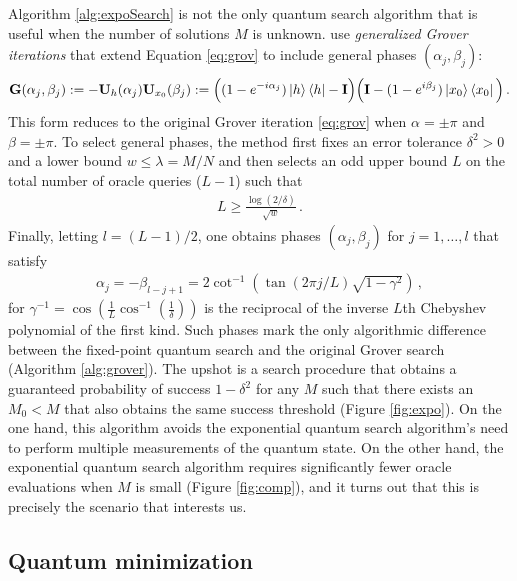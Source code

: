 \documentclass[12pt]{article} %
\begin{document}
 
Algorithm \ref{alg:expoSearch} is not the only quantum search algorithm that is useful when the number of solutions $M$ is unknown.  \citet{yoder2014fixed} use \emph{generalized Grover iterations} that extend Equation \eqref{eq:grov} to include general phases $(\alpha_j,\beta_j)$:
\begin{align}\label{eq:grovGen}
	\mathbf{G}(\alpha_j,\beta_j) := - \mathbf{U}_h(\alpha_j) \mathbf{U}_{x_0}(\beta_j) := \Big((1-e^{-i\alpha_j})\ket{h}\bra{h}-\mathbf{I} \Big) \Big( \mathbf{I} - (1-e^{i\beta_j}) \ket{x_0}\bra{x_0} \Big) \, .
\end{align}
This form reduces to the original Grover iteration \eqref{eq:grov} when $\alpha=\pm \pi$ and $\beta=\pm \pi$.
To select general phases, the method first fixes an error tolerance $\delta^2>0$ and a lower bound $w\leq \lambda=M/N$ and then selects an odd upper bound $L$ on the total number of oracle queries ($L-1$) such that 
\begin{align*}
	L \geq \frac{\log(2/\delta)}{\sqrt{w}} \, .
\end{align*}
Finally,  letting $l=(L-1)/2$, one obtains phases $(\alpha_j,\beta_j)$ for $j=1,\dots,l$ that satisfy
\begin{align*}
	\alpha_j = - \beta_{l-j+1} =2 \cot^{-1} \left( \tan(2\pi j /L) \sqrt{1-\gamma^2} \right) \, ,
\end{align*}
 for $\gamma^{-1} =  \cos(\frac{1}{L}\cos^{-1}(\frac{1}{\delta}))$ is the reciprocal of the inverse  $L$th Chebyshev polynomial of the first kind.  Such phases mark the only algorithmic difference between the fixed-point quantum search and the original Grover search (Algorithm \ref{alg:grover}).  The upshot is a search procedure that obtains a guaranteed probability of success $1-\delta^2$ for any $M$ such that there exists an $M_0<M$ that also obtains the same success threshold (Figure \ref{fig:expo}).  On the one hand, this algorithm avoids the exponential quantum search algorithm's need to perform multiple measurements of the quantum state.  On the other hand, the exponential quantum search algorithm requires significantly fewer oracle evaluations when $M$ is small (Figure \ref{fig:comp}), and it turns out that this is precisely the scenario that interests us.
 
 \subsection{Quantum minimization}\label{sec:qmin}
\end{document}
